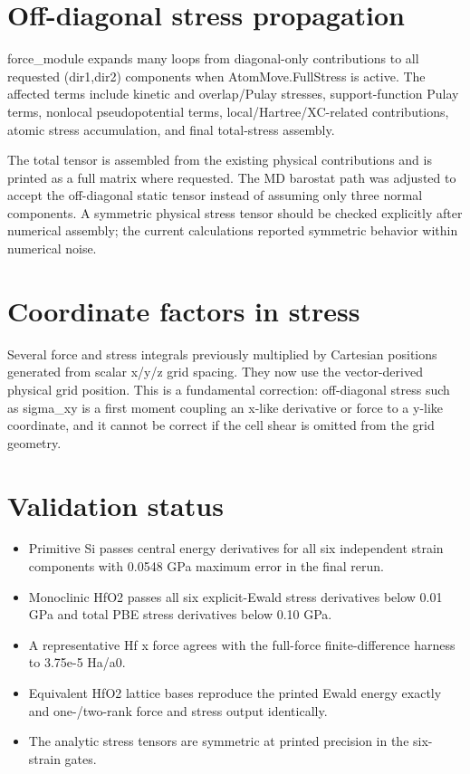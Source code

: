 \documentclass[10pt,a4paper]{report}
\begin{document}
\section{Off-diagonal stress propagation}
force\_module expands many loops from diagonal-only contributions to all requested (dir1,dir2) components when AtomMove.FullStress is active. The affected terms include kinetic and overlap/Pulay stresses, support-function Pulay terms, nonlocal pseudopotential terms, local/Hartree/XC-related contributions, atomic stress accumulation, and final total-stress assembly.

The total tensor is assembled from the existing physical contributions and is printed as a full matrix where requested. The MD barostat path was adjusted to accept the off-diagonal static tensor instead of assuming only three normal components. A symmetric physical stress tensor should be checked explicitly after numerical assembly; the current calculations reported symmetric behavior within numerical noise.

\section{Coordinate factors in stress}
Several force and stress integrals previously multiplied by Cartesian positions generated from scalar x/y/z grid spacing. They now use the vector-derived physical grid position. This is a fundamental correction: off-diagonal stress such as sigma\_xy is a first moment coupling an x-like derivative or force to a y-like coordinate, and it cannot be correct if the cell shear is omitted from the grid geometry.

\section{Validation status}
\begin{itemize}
\item Primitive Si passes central energy derivatives for all six independent strain components with 0.0548 GPa maximum error in the final rerun.
\item Monoclinic HfO2 passes all six explicit-Ewald stress derivatives below 0.01 GPa and total PBE stress derivatives below 0.10 GPa.
\item A representative Hf x force agrees with the full-force finite-difference harness to 3.75e-5 Ha/a0.
\item Equivalent HfO2 lattice bases reproduce the printed Ewald energy exactly and one-/two-rank force and stress output identically.
\item The analytic stress tensors are symmetric at printed precision in the six-strain gates.
\end{itemize}
\end{document}
